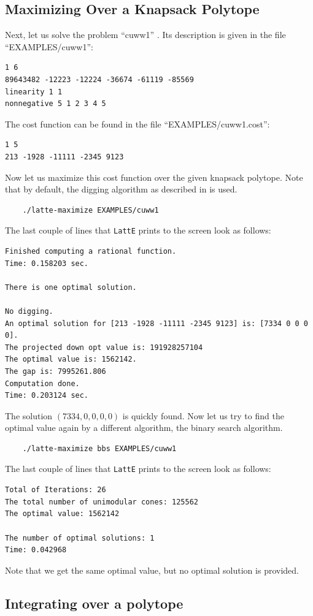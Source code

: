 \documentclass{article}
\begin{document}
\subsection{Maximizing Over a Knapsack Polytope}
Next, let us solve the problem ``cuww1'' \cite{cuww,latte3}. Its
description is given in the file ``EXAMPLES/cuww1'': 
\begin{verbatim}
1 6
89643482 -12223 -12224 -36674 -61119 -85569
linearity 1 1
nonnegative 5 1 2 3 4 5
\end{verbatim}
The cost function can be found in the file ``EXAMPLES/cuww1.cost'':
\begin{verbatim}
1 5
213 -1928 -11111 -2345 9123 
\end{verbatim}
Now let us maximize this cost function over the given knapsack
polytope. Note that by default, the digging algorithm as described in
\cite{latte3} is used.
\begin{verbatim}
    ./latte-maximize EXAMPLES/cuww1
\end{verbatim}
The last couple of lines that {\tt LattE} prints to the screen
look as follows:
{\small
\begin{verbatim}
Finished computing a rational function. 
Time: 0.158203 sec.

There is one optimal solution. 		

No digging.
An optimal solution for [213 -1928 -11111 -2345 9123] is: [7334 0 0 0 0].
The projected down opt value is: 191928257104
The optimal value is: 1562142.
The gap is: 7995261.806
Computation done.
Time: 0.203124 sec.
\end{verbatim}
}
The solution $(7334,0,0,0,0)$ is quickly found. Now let us try to
find the optimal value again by a different algorithm, the binary
search algorithm.
\begin{verbatim}
    ./latte-maximize bbs EXAMPLES/cuww1
\end{verbatim}
The last couple of lines that {\tt LattE} prints to the screen
look as follows:
\begin{verbatim}
Total of Iterations: 26
The total number of unimodular cones: 125562
The optimal value: 1562142

The number of optimal solutions: 1
Time: 0.042968
\end{verbatim}
Note that we get the same optimal value, but no optimal solution is
provided.


\subsection{Integrating over a polytope}
\end{document}
